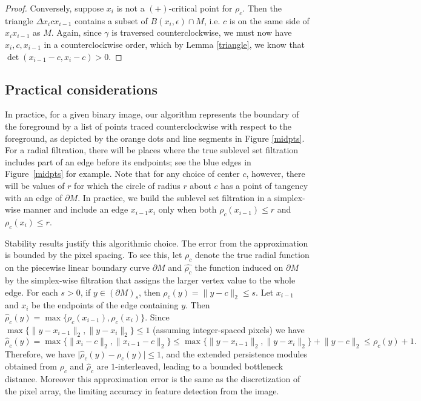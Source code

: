 \documentclass[a4paper,11pt]{article}
\theoremstyle{definition}
\begin{document}
\begin{proof}
Conversely, suppose $x_i$ is not a $(+)$-critical point for $\rho_c$. Then the triangle $\Delta x_icx_{i-1}$ contains a subset of $B(x_i,\epsilon)\cap M$, i.e. $c$ is on the same side of $x_ix_{i-1}$ as $M$. Again, since $\gamma$ is traversed counterclockwise, we must now have $x_i,c,x_{i-1}$ in a counterclockwise order, which by Lemma \ref{triangle}, we know that $\det(x_{i-1}-c,x_i-c)>0$.
\end{proof}

\subsection{Practical considerations}
\label{practical}

In practice, for a given binary image, our algorithm represents the boundary of the foreground by a list of points traced counterclockwise with respect to the foreground, as depicted by the orange dots and line segments in Figure \ref{midpts}. 
For a radial filtration, there will be places where the true sublevel set filtration includes part of an edge before its endpoints; see the blue edges in Figure~\ref{midpts} for example. 
Note that for any choice of center $c$, however, there will be values of $r$ for which the circle of radius $r$ about $c$ has a point of tangency with an edge of $\partial M$. 
In practice, we build the sublevel set filtration in a simplex-wise manner and include an edge $x_{i-1} x_i$ only when both $\rho_c(x_{i-1}) \leq r$ and $\rho_c(x_{i}) \leq r$.
 
Stability results justify this algorithmic choice. The error from the approximation is bounded by the pixel spacing.  
To see this, let $\rho_c$ denote the true radial function on the piecewise linear boundary curve $\partial M$ and $\widehat{\rho_c}$ the function induced on $\partial M$ by the simplex-wise filtration that assigns the larger vertex value to the whole edge. 
For each $s>0$, if $y\in (\partial M)_s$, then $\rho_c(y)=\lVert y- c\rVert_2\le s$. 
Let  $x_{i-1}$ and $x_i$ be the endpoints of the edge containing $y$. 
Then $\hat{\rho}_c(y)=\max\{\rho_c(x_{i-1}),\rho_c(x_i)\}.$ Since $\max\{\lVert y-x_{i-1}\rVert_2,\lVert y-x_i\rVert_2\}\le 1$ (assuming integer-spaced pixels) we have $$\hat{\rho}_c(y)=\max\{\lVert x_i-c\rVert_2, \lVert x_{i-1}-c\rVert_2\}\le \max\{\lVert y-x_{i-1}\rVert_2,\lVert y-x_i\rVert_2\}+\lVert y-c\rVert_2\le \rho_c(y)+1.$$ Therefore, we have $\lvert\hat{\rho}_c(y)-\rho_c(y)\rvert\le 1$, and the extended persistence modules  
obtained from $\rho_c$ and $\hat{\rho}_c$ are $1$-interleaved, leading to a bounded bottleneck distance. 
Moreover this approximation error is the same as the discretization of the pixel array, the limiting accuracy in feature detection from the image.    
\end{document}
